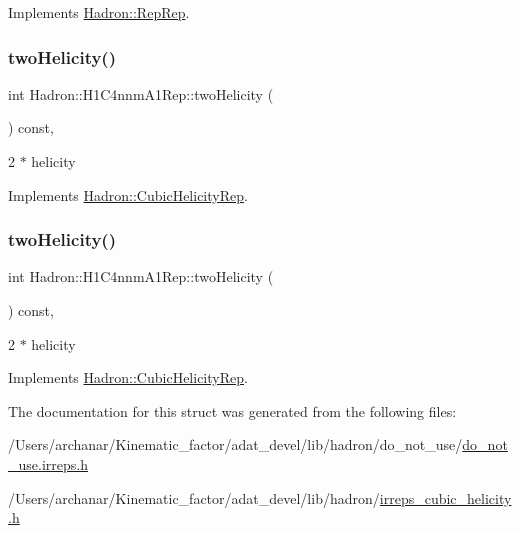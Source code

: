 Implements \mbox{\hyperlink{structHadron_1_1RepRep_ab3213025f6de249f7095892109575fde}{Hadron\+::\+Rep\+Rep}}.

\mbox{\label{structHadron_1_1H1C4nnmA1Rep_aea3a7ff3c7439030c6189916e333af31}} 
\subsubsection{\texorpdfstring{twoHelicity()}{twoHelicity()}\hspace{0.1cm}{\footnotesize\ttfamily [1/2]}}
{\footnotesize\ttfamily int Hadron\+::\+H1\+C4nnm\+A1\+Rep\+::two\+Helicity (\begin{DoxyParamCaption}{ }\end{DoxyParamCaption}) const\hspace{0.3cm}{\ttfamily [inline]}, {\ttfamily [virtual]}}

2 $\ast$ helicity 

Implements \mbox{\hyperlink{structHadron_1_1CubicHelicityRep_af507aa56fc2747eacc8cb6c96db31ecc}{Hadron\+::\+Cubic\+Helicity\+Rep}}.

\mbox{\label{structHadron_1_1H1C4nnmA1Rep_aea3a7ff3c7439030c6189916e333af31}} 
\subsubsection{\texorpdfstring{twoHelicity()}{twoHelicity()}\hspace{0.1cm}{\footnotesize\ttfamily [2/2]}}
{\footnotesize\ttfamily int Hadron\+::\+H1\+C4nnm\+A1\+Rep\+::two\+Helicity (\begin{DoxyParamCaption}{ }\end{DoxyParamCaption}) const\hspace{0.3cm}{\ttfamily [inline]}, {\ttfamily [virtual]}}

2 $\ast$ helicity 

Implements \mbox{\hyperlink{structHadron_1_1CubicHelicityRep_af507aa56fc2747eacc8cb6c96db31ecc}{Hadron\+::\+Cubic\+Helicity\+Rep}}.



The documentation for this struct was generated from the following files\+:\begin{DoxyCompactItemize}
\item 
/\+Users/archanar/\+Kinematic\+\_\+factor/adat\+\_\+devel/lib/hadron/do\+\_\+not\+\_\+use/\mbox{\hyperlink{do__not__use_8irreps_8h}{do\+\_\+not\+\_\+use.\+irreps.\+h}}\item 
/\+Users/archanar/\+Kinematic\+\_\+factor/adat\+\_\+devel/lib/hadron/\mbox{\hyperlink{lib_2hadron_2irreps__cubic__helicity_8h}{irreps\+\_\+cubic\+\_\+helicity.\+h}}\end{DoxyCompactItemize}
